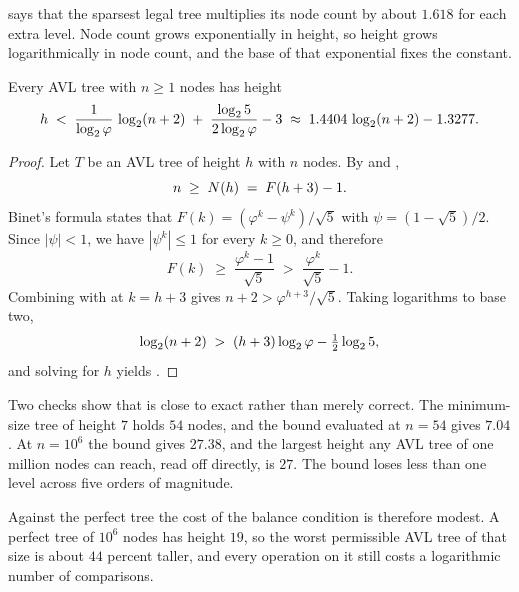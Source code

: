  says that the sparsest legal tree multiplies its node count by
about $1.618$ for each extra level. Node count grows exponentially in height, so
height grows logarithmically in node count, and the base of that exponential
fixes the constant.

\begin{theorem}
\label{thm:heightbound}
Every AVL tree with $n \ge 1$ nodes has height
\begin{equation}
  \label{eq:heightbound}
  h \;<\; \frac{1}{\log_{2}\varphi}\,\log_{2}(n+2) \;+\; \frac{\log_{2}5}{2\log_{2}\varphi} - 3
  \;\approx\; 1.4404\,\log_{2}(n+2) - 1.3277 .
\end{equation}
\end{theorem}

\begin{proof}
Let $T$ be an AVL tree of height $h$ with $n$ nodes. By  and
,
\begin{equation}
  \label{eq:nge}
  n \;\ge\; N(h) \;=\; F(h+3) - 1 .
\end{equation}
Binet's formula states that $F(k) = (\varphi^{k} - \psi^{k})/\sqrt{5}$ with
$\psi = (1-\sqrt{5})/2$. Since $|\psi| < 1$, we have $|\psi^{k}| \le 1$ for every
$k \ge 0$, and therefore
\begin{equation}
  \label{eq:fiblower}
  F(k) \;\ge\; \frac{\varphi^{k} - 1}{\sqrt{5}} \;>\; \frac{\varphi^{k}}{\sqrt{5}} - 1 .
\end{equation}
Combining  with  at $k = h+3$ gives
$n + 2 > \varphi^{h+3}/\sqrt{5}$. Taking logarithms to base two,
\begin{equation}
  \label{eq:logstep}
  \log_{2}(n+2) \;>\; (h+3)\log_{2}\varphi - \tfrac{1}{2}\log_{2}5 ,
\end{equation}
and solving  for $h$ yields .
\end{proof}

Two checks show that  is close to exact rather than merely
correct. The minimum-size tree of height $7$ holds $54$ nodes, and the bound
evaluated at $n = 54$ gives $7.04$. At $n = 10^{6}$ the bound gives $27.38$,
and the largest height any AVL tree of one million nodes can reach, read off
 directly, is $27$. The bound loses less than one level across five
orders of magnitude.

Against the perfect tree the cost of the balance condition is therefore modest. A
perfect tree of $10^{6}$ nodes has height $19$, so the worst permissible AVL tree
of that size is about $44$ percent taller, and every operation on it still costs
a logarithmic number of comparisons.

